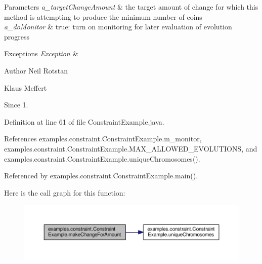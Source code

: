 \begin{DoxyParams}{Parameters}
{\em a\-\_\-target\-Change\-Amount} & the target amount of change for which this method is attempting to produce the minimum number of coins \\
\hline
{\em a\-\_\-do\-Monitor} & true\-: turn on monitoring for later evaluation of evolution progress\\
\hline
\end{DoxyParams}

\begin{DoxyExceptions}{Exceptions}
{\em Exception} & \\
\hline
\end{DoxyExceptions}
\begin{DoxyAuthor}{Author}
Neil Rotstan 

Klaus Meffert 
\end{DoxyAuthor}
\begin{DoxySince}{Since}
1. 
\end{DoxySince}


Definition at line 61 of file Constraint\-Example.\-java.



References examples.\-constraint.\-Constraint\-Example.\-m\-\_\-monitor, examples.\-constraint.\-Constraint\-Example.\-M\-A\-X\-\_\-\-A\-L\-L\-O\-W\-E\-D\-\_\-\-E\-V\-O\-L\-U\-T\-I\-O\-N\-S, and examples.\-constraint.\-Constraint\-Example.\-unique\-Chromosomes().



Referenced by examples.\-constraint.\-Constraint\-Example.\-main().



Here is the call graph for this function\-:
\nopagebreak
\begin{figure}[H]
\begin{center}
\leavevmode
\includegraphics[width=350pt]{classexamples_1_1constraint_1_1_constraint_example_ada505ec492fbb8c2792f5701cbbc8664_cgraph}
\end{center}
\end{figure}


